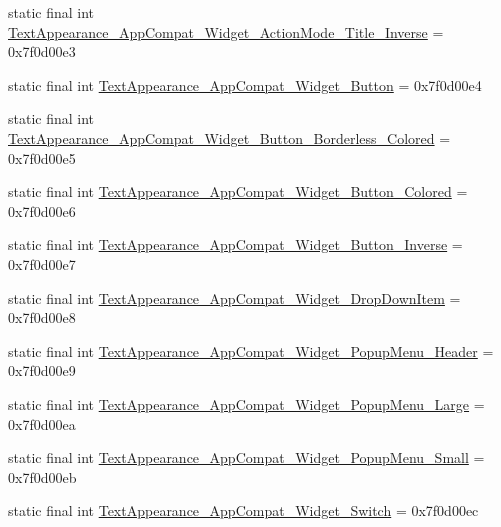 \begin{DoxyCompactItemize}
\item 
static final int \mbox{\hyperlink{classandroid_1_1support_1_1design_1_1_r_1_1style_aad2554eae3444b77e7be2d9754c380f8}{Text\+Appearance\+\_\+\+App\+Compat\+\_\+\+Widget\+\_\+\+Action\+Mode\+\_\+\+Title\+\_\+\+Inverse}} = 0x7f0d00e3
\item 
static final int \mbox{\hyperlink{classandroid_1_1support_1_1design_1_1_r_1_1style_a5af41ce514978fd38404e848b723b5ae}{Text\+Appearance\+\_\+\+App\+Compat\+\_\+\+Widget\+\_\+\+Button}} = 0x7f0d00e4
\item 
static final int \mbox{\hyperlink{classandroid_1_1support_1_1design_1_1_r_1_1style_a7fbd0962654b7e24b60836a045beb67b}{Text\+Appearance\+\_\+\+App\+Compat\+\_\+\+Widget\+\_\+\+Button\+\_\+\+Borderless\+\_\+\+Colored}} = 0x7f0d00e5
\item 
static final int \mbox{\hyperlink{classandroid_1_1support_1_1design_1_1_r_1_1style_a733e1e98437c5657d194de9d0d94f9be}{Text\+Appearance\+\_\+\+App\+Compat\+\_\+\+Widget\+\_\+\+Button\+\_\+\+Colored}} = 0x7f0d00e6
\item 
static final int \mbox{\hyperlink{classandroid_1_1support_1_1design_1_1_r_1_1style_ae2c7ba38fc4c6f627225328c5e11bde9}{Text\+Appearance\+\_\+\+App\+Compat\+\_\+\+Widget\+\_\+\+Button\+\_\+\+Inverse}} = 0x7f0d00e7
\item 
static final int \mbox{\hyperlink{classandroid_1_1support_1_1design_1_1_r_1_1style_a85111e6e10aa78550520255cf9807a59}{Text\+Appearance\+\_\+\+App\+Compat\+\_\+\+Widget\+\_\+\+Drop\+Down\+Item}} = 0x7f0d00e8
\item 
static final int \mbox{\hyperlink{classandroid_1_1support_1_1design_1_1_r_1_1style_a967c5cd773fb811beca02b78c978368a}{Text\+Appearance\+\_\+\+App\+Compat\+\_\+\+Widget\+\_\+\+Popup\+Menu\+\_\+\+Header}} = 0x7f0d00e9
\item 
static final int \mbox{\hyperlink{classandroid_1_1support_1_1design_1_1_r_1_1style_ac31cc585803346f3237a75da48107a04}{Text\+Appearance\+\_\+\+App\+Compat\+\_\+\+Widget\+\_\+\+Popup\+Menu\+\_\+\+Large}} = 0x7f0d00ea
\item 
static final int \mbox{\hyperlink{classandroid_1_1support_1_1design_1_1_r_1_1style_a4be044c1dccfdfd0fc8caef81efad1bd}{Text\+Appearance\+\_\+\+App\+Compat\+\_\+\+Widget\+\_\+\+Popup\+Menu\+\_\+\+Small}} = 0x7f0d00eb
\item 
static final int \mbox{\hyperlink{classandroid_1_1support_1_1design_1_1_r_1_1style_a235664d14c9d1c9eb319a06fca1e7647}{Text\+Appearance\+\_\+\+App\+Compat\+\_\+\+Widget\+\_\+\+Switch}} = 0x7f0d00ec

\end{DoxyCompactItemize}
